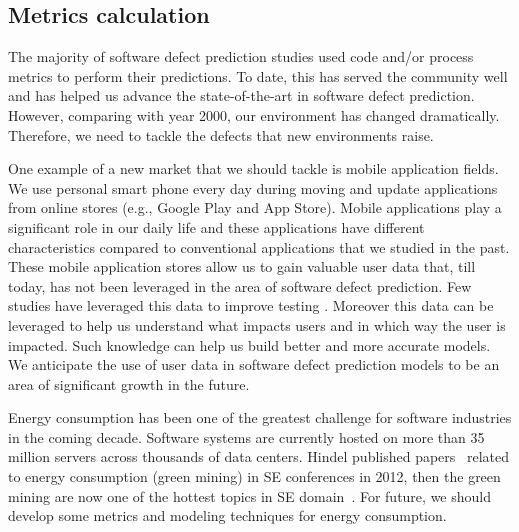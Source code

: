 \subsection{Metrics calculation}

The majority of software defect prediction studies used code and/or process metrics to perform their predictions. To date, this has served the community well and has helped us advance the state-of-the-art in software defect prediction.
However, comparing with year 2000, our environment has changed dramatically. Therefore, we need to tackle the defects that new environments raise. 

One example of a new market that we should tackle is mobile application fields. We use personal smart phone every day during moving and update applications from online stores (e.g., Google Play and App Store). Mobile applications play a significant role in our daily life and these applications have different characteristics compared to conventional applications that we studied in the past. These mobile application stores allow us to gain valuable user data that, till today, has not been leveraged in the area of software defect prediction. Few studies have leveraged this data to improve testing \cite{Khalid2014FSE,Khalid2015IEEESoft}. Moreover this data can be leveraged to help us understand what impacts users and in which way the user is impacted. Such knowledge can help us build better and more accurate models. We anticipate the use of user data in software defect prediction models to be an area of significant growth in the future.

Energy consumption has been one of the greatest challenge for software industries in the coming decade. Software systems are currently hosted on more than 35 million servers across thousands of data centers. Hindel published papers~\cite{Hindle2012ICSE,Hindle2012MSR} related to energy consumption (green mining) in SE conferences in 2012, then the green mining are now one of the hottest topics in SE domain~\cite{Pinto2014MSR,Sahin2014ICSME}. For future, we should develop some metrics and modeling techniques for energy consumption.

